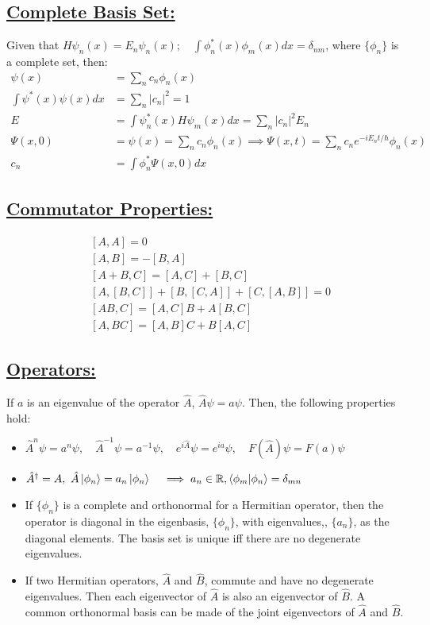 \documentclass[a4paper,12pt]{article}
\begin{document}
\subsection*{\underline{Complete Basis Set:}}
Given that $H\psi_n(x)=E_n\psi_n(x);\quad \int\phi^*_n(x)\phi_m(x)dx=\delta_{nm}$, where $\{\phi_n\}$ is a complete set, then:
\begin{align*}
    \psi(x)&=\sum_nc_n\phi_n(x)\\
    \int\psi^*(x)\psi(x)dx&=\sum_n|c_n|^2=1\\
    E&=\int\psi^*_n(x)H\psi_m(x)dx=\sum_n|c_n|^2E_n\\
    \Psi(x,0)&=\psi(x)=\sum_nc_n\phi_n(x)\implies\Psi(x,t)=\sum_nc_ne^{-iE_nt/\hbar}\phi_n(x)\\
    c_n&=\int\phi_n^*\Psi(x,0)dx
\end{align*}
\subsection*{\underline{Commutator Properties:}}
\begin{align*}
    &[A,A]=0\\
    &[A,B]=-[B,A]\\
    &[A+B,C]=[A,C]+[B,C]\\
    &[A,[B,C]]+[B,[C,A]]+[C,[A,B]]=0\\
    &[AB,C]=[A,C]B+A[B,C]\\
    &[A,BC]=[A,B]C+B[A,C]
\end{align*}
\subsection*{\underline{Operators:}}
If $a$ is an eigenvalue of the operator $\hat{A}$, $\hat{A}\psi=a\psi$. Then, the following properties hold:
\begin{itemize}
    \item $\hat{A}^n\psi=a^n\psi,\quad \hat{A}^{-1}\psi=a^{-1}\psi,\quad e^{i\hat{A}}\psi=e^{ia}\psi,\quad F(\hat{A})\psi=F(a)\psi$
    \item $\hat{A}^{\dagger}=A,\ \hat{A}\ket{\phi_n}=a_n\ket{\phi_n} \quad \implies a_n\in \mathbb{R}, \braket{\phi_m|\phi_n}=\delta_{mn}$
    \item If $\{\phi_n\}$ is a complete and orthonormal for a Hermitian operator, then the operator is diagonal in the eigenbasis, $\{\phi_n\}$, with eigenvalues,, $\{a_n\}$, as the diagonal elements. The basis set is unique iff there are no degenerate eigenvalues.
    \item If two Hermitian operators, $\hat{A}$ and $\hat{B}$, commute and have no degenerate eigenvalues. Then each eigenvector of $\hat{A}$ is also an eigenvector of $\hat{B}$. A common orthonormal basis can be made of the joint eigenvectors of $\hat{A}$ and $\hat{B}$.
\end{itemize}
\end{document}
